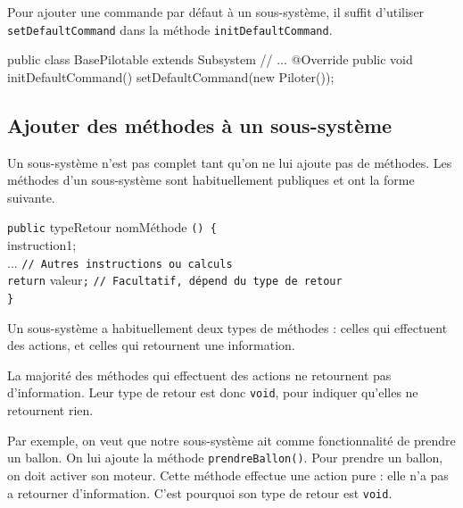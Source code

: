 \documentclass[12pt]{report}
\begin{document}
Pour ajouter une commande par défaut à un sous-système, il suffit d'utiliser \texttt{setDefaultCommand} dans la méthode \texttt{initDefaultCommand}.

\begin{code}
public class BasePilotable extends Subsystem {
  // ...
  @Override
  public void initDefaultCommand() {
    setDefaultCommand(new Piloter());
  }
}
\end{code}

\subsection{Ajouter des méthodes à un sous-système}
Un sous-système n'est pas complet tant qu'on ne lui ajoute pas de méthodes. Les méthodes d'un sous-système sont habituellement publiques et ont la forme suivante.

\begin{tcolorbox}[enhanced,colframe=ultRed,
	title={La déclaration d'une méthode dans un sous-système},
	sharp corners=south,
	boxsep = 1.5mm]
\texttt{{\color{ultRed}public}} {\color[RGB]{255, 34, 12} typeRetour} {\color[RGB]{12, 190, 12} nomMéthode} \texttt{() \{}\\[2pt]
	\hspace*{0.5cm} {\color[RGB]{63, 136, 197} instruction1};\\[7pt]
	\hspace*{0.5cm} ... \texttt{// Autres instructions ou calculs}\\[7pt]
	\hspace*{0.5cm} \texttt{{\color{ultRed}return}} {\color[RGB]{255, 34, 12}valeur}\texttt{;} \texttt{// Facultatif, dépend du type de retour}\\[2pt]
	\texttt{\}}
%
\end{tcolorbox}

Un sous-système a habituellement deux types de méthodes : celles qui effectuent des actions, et celles qui retournent une information. 

La majorité des méthodes qui effectuent des actions ne retournent pas d'information. Leur type de retour est donc \texttt{void}, pour indiquer qu'elles ne retournent rien.

Par exemple, on veut que notre sous-système ait comme fonctionnalité de prendre un ballon. On lui ajoute la méthode \texttt{prendreBallon()}. Pour prendre un ballon, on doit activer son moteur. Cette méthode effectue une action pure : elle n'a pas a retourner d'information. C'est pourquoi son type de retour est \texttt{void}. 
\end{document}
